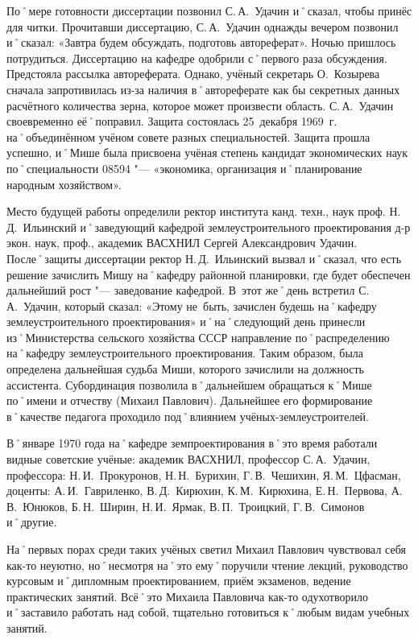 По˚мере готовности диссертации позвонил С.\,А.~Удачин и˚сказал, чтобы принёс для читки. Прочитавши диссертацию, С.\,А.~Удачин однажды вечером позвонил и˚сказал: «Завтра будем обсуждать, подготовь автореферат». Ночью пришлось потрудиться. Диссертацию на кафедре одобрили с˚первого раза обсуждения. Предстояла рассылка автореферата. Однако, учёный секретарь О.~Козырева сначала запротивилась из-за наличия в˚автореферате как бы секретных данных расчётного количества зерна, которое может произвести область. С.\,А.~Удачин своевременно её˚поправил. Защита состоялась 25~декабря 1969~г. на˚объединённом учёном совете разных специальностей. Защита прошла успешно, и˚Мише была присвоена учёная степень кандидат экономических наук по˚специальности 08594 "--- «экономика, организация и˚планирование народным хозяйством». 

Место будущей работы определили ректор института канд. техн., наук проф. Н.\,Д.~Ильинский и˚заведующий кафедрой землеустроительного проектирования д-р экон. наук, проф., академик ВАСХНИЛ Сергей Александрович Удачин. После˚защиты диссертации ректор Н.\,Д.~Ильинский вызвал и˚сказал, что есть решение зачислить Мишу на˚кафедру районной планировки, где будет обеспечен дальнейший рост "--- заведование кафедрой. В~этот же˚день встретил С.\,А.~Удачин, который сказал: «Этому не~быть, зачислен будешь на˚кафедру землеустроительного проектирования» и˚на˚следующий день принесли из˚Министерства сельского хозяйства СССР направление по˚распределению на˚кафедру землеустроительного проектирования. Таким образом, была определена дальнейшая судьба Миши, которого зачислили на должность ассистента. Субординация позволила в˚дальнейшем обращаться к˚Мише по˚имени и отчеству (Михаил Павлович). Дальнейшее его формирование в˚качестве педагога проходило под˚влиянием учёных-землеустроителей.

В˚январе 1970 года на˚кафедре земпроектирования в˚это время работали видные советские учёные: академик ВАСХНИЛ, профессор С.\,А.~Удачин, профессора: Н.\,И.~Прокуронов, Н.\,Н.~Бурихин, Г.\,В.~Чешихин, Я.\,М.~Цфасман, доценты: А.\,И.~Гавриленко, В.\,Д.~Кирюхин, К.\,М.~Кирюхина, Е.\,Н.~Первова, А.\,В.~Юнюков, Б.\,Н.~Ширин, Н.\,И.~Ярмак, В.\,П.~Троицкий, Г.\,В.~Симонов и˚другие. 

На˚первых порах среди таких учёных светил Михаил Павлович чувствовал себя как-то неуютно, но˚несмотря на˚это ему˚поручили чтение лекций, руководство курсовым и˚дипломным проектированием, приём экзаменов, ведение практических занятий. Всё˚это Михаила Павловича как-то одухотворило и˚заставило работать над собой, тщательно готовиться к˚любым видам учебных занятий.

